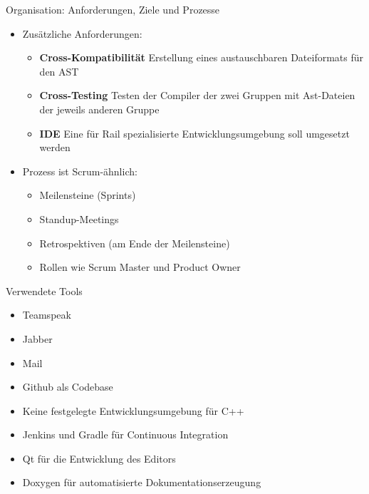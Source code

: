 \begin{frame}{Organisation: Anforderungen, Ziele und Prozesse}

	\pause
	\begin{itemize}
		\item Zus\"atzliche Anforderungen:
		\pause
		\begin{itemize}
			\item \textbf{\textcolor{fu-blue}{Cross-Kompatibilit\"at}} Erstellung eines austauschbaren Dateiformats f\"ur den AST
			\pause
			\item \textbf{\textcolor{fu-blue}{Cross-Testing}} Testen der Compiler der zwei Gruppen mit Ast-Dateien der jeweils anderen Gruppe
			\pause
			\item \textbf{\textcolor{fu-blue}{IDE}} Eine f\"ur Rail spezialisierte Entwicklungsumgebung soll umgesetzt werden
			\pause
		\end{itemize}
		\item Prozess ist Scrum-\"ahnlich:
		\pause
		\begin{itemize}
			\item Meilensteine (Sprints)
			\pause
			\item Standup-Meetings
			\pause
			\item Retrospektiven (am Ende der Meilensteine)
			\pause
			\item Rollen wie Scrum Master und Product Owner
		\end{itemize}
	\end{itemize}

\end{frame}

\pagebreak


\begin{frame}{Verwendete Tools}

	\pause
	\begin{itemize}
		\item Teamspeak
		\pause
		\item Jabber
		\pause
		\item Mail 
		\pause
		\item Github als Codebase
		\pause
		\item Keine festgelegte Entwicklungsumgebung f\"ur C++
		\pause
		\item Jenkins und Gradle f\"ur Continuous Integration
		\pause
		\item Qt f\"ur die Entwicklung des Editors
		\pause
		\item Doxygen f\"ur automatisierte Dokumentationserzeugung
	\end{itemize}


\end{frame}


